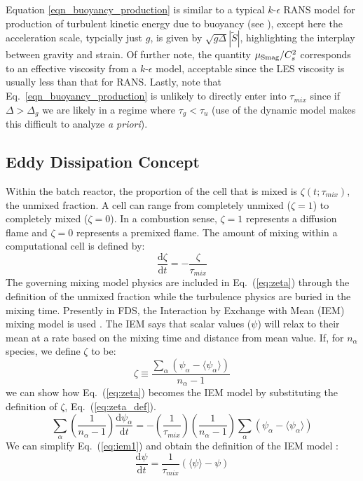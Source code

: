 Equation \ref{eqn_buoyancy_production} is similar to a typical $k$-$\epsilon$ RANS model for production of turbulent kinetic energy due to buoyancy (see \cite{Teiszen:2004b,Merci:2005}), except here the acceleration scale, typcially just $g$, is given by $\sqrt{\!g\Delta}|\tilde{S}|$, highlighting the interplay between gravity and strain.  Of further note, the quantity $\mu_{\mbox{\scriptsize Smag}}/C_s^2$ corresponds to an effective viscosity from a $k$-$\epsilon$ model, acceptable since the LES viscosity is usually less than that for RANS.  Lastly, note that Eq.~\ref{eqn_buoyancy_production} is unlikely to directly enter into $\tau_{mix}$ since if $\Delta > \Delta_g$ we are likely in a regime where $\tau_g < \tau_u$ (use of the dynamic model makes this difficult to analyze \emph{a priori}).


\subsection{Eddy Dissipation Concept}
\label{sec:EDC} 
Within the batch reactor, the proportion of the cell that is mixed is $\zeta(t;\tau_{mix})$, the unmixed fraction. A cell can range from completely unmixed ($\zeta=1$) to completely mixed ($\zeta=0$). In a combustion sense, $\zeta=1$  represents a diffusion flame and $\zeta=0$ represents a premixed flame. The amount of mixing within a computational cell is defined by:
\begin{equation}\label{eq:zeta}
\frac{\mbox{d}\zeta}{\mbox{d}t}=-\frac{\zeta}{\tau_{mix}}
\end{equation}
The governing mixing model physics are included in Eq.~(\ref{eq:zeta}) through the definition of the unmixed fraction while the turbulence physics are buried in the mixing time. Presently in FDS, the Interaction by Exchange with Mean (IEM) mixing model is used \cite{fox2003}. The IEM says that scalar values ($\psi$) will relax to their mean at a rate based on the mixing time and distance from mean value.  If, for $n_{\alpha}$ species, we define $\zeta$ to be:
\begin{equation}\label{eq:zeta_def}
\zeta \equiv \frac{\displaystyle \sum_{\alpha}(\psi_{\alpha}- \langle \psi_{\alpha} \rangle )}{n_{\alpha} - 1}
\end{equation}
we can show how Eq.~(\ref{eq:zeta}) becomes the IEM model by substituting the definition of $\zeta$, Eq.~(\ref{eq:zeta_def}).
\begin{equation}\label{eq:iem1}
\displaystyle \sum_{\alpha}\left(\frac{1}{n_{\alpha}-1}\right) \frac{\mbox{d}\psi_{\alpha}}{\mbox{d}t} = - \left(\frac{1}{\tau_{mix}}\right) \left(\frac{1}{n_{\alpha}-1} \right) \displaystyle \sum_{\alpha}(\psi_{\alpha}- \langle \psi_{\alpha} \rangle)
\end{equation}
We can simplify Eq.~(\ref{eq:iem1}) and obtain the definition of the IEM model \cite{fox2003}:
\begin{equation}\label{eq:iem2}
\frac{\mbox{d}\psi}{\mbox{d}t} = \frac{1}{\tau_{mix}}(\langle \psi \rangle - \psi)
\end{equation}
      
